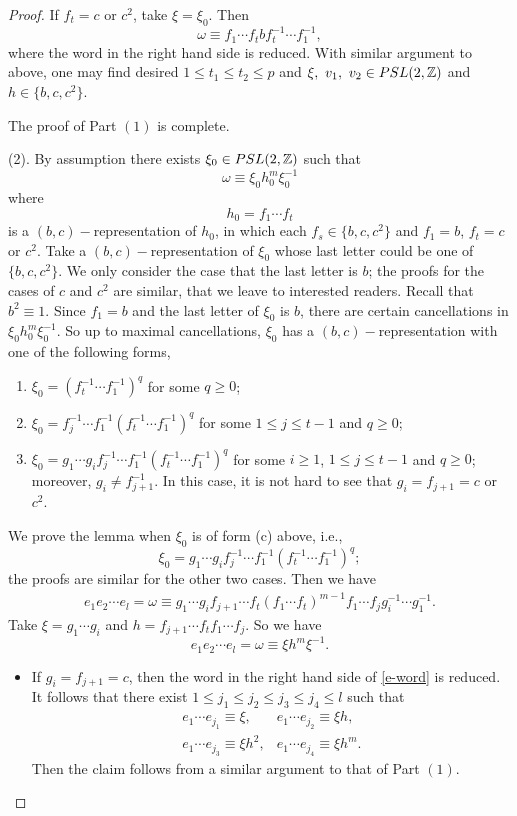 \documentclass[10pt,a4paper]{amsart}
\begin{document}
\begin{proof}
        If $f_t=c$ or $c^2$, take $\xi=\xi_0$. Then 
        $$\omega\equiv f_1\cdots f_tbf_t^{-1}\cdots f_1^{-1},$$
        where the word in the right hand side is reduced. With similar argument to above, one may find desired $1\leq t_1\leq t_2\leq p$ and $\xi,\ v_1,\ v_2\in\textnormal{PSL}(2,\mathbb{Z})$ and $h\in\{b,c,c^2\}$.

        The proof of Part $(1)$ is complete.
        
        (2). By assumption there exists $\xi_0\in\textnormal{PSL}(2,\mathbb{Z})$ such that $$\omega\equiv \xi_0 h_0^m\xi_0^{-1}$$ where
        $$h_0=f_1\cdots f_t$$
        is a $(b,c)-$representation of $h_0$, in which each $f_s\in\{b,c,c^{2}\}$ and $f_1=b$, $f_t=c$ or $c^{2}$. Take a $(b,c)-$representation of $\xi_0$ whose last letter could be one of $\{b,c,c^2\}$. We only consider the case that the last letter is $b$; the proofs for the cases of $c$ and $c^2$ are similar, that we leave to interested readers. Recall that $b^2 \equiv 1$. Since $f_1=b$ and the last letter of $\xi_0$ is $b$, there are certain cancellations in $\xi_0 h_0^m\xi_0^{-1}.$ So up to maximal cancellations, $\xi_0$ has a $(b,c)-$representation with one of the following forms,
        \begin{enumerate}
            \item $\xi_0=\left(f_t^{-1}\cdots f_1^{-1}\right)^q$ for some $q\geq 0$;
            \item $\xi_0=f_j^{-1}\cdots f_1^{-1}\left(f_t^{-1}\cdots f_1^{-1}\right)^q$ for some $1\leq j\leq t-1$ and $q\geq 0$;
            \item $\xi_0=g_1\cdots g_if_j^{-1}\cdots f_1^{-1}\left(f_t^{-1}\cdots f_1^{-1}\right)^q$ for some $i\geq 1$, $1\leq j\leq t-1$ and $q\geq 0$; moreover, $g_i \neq f_{j+1}^{-1}$. In this case, it is not hard to see that $g_i=f_{j+1}=c$ or $c^2$.
        \end{enumerate}
         We prove the lemma when $\xi_0$ is of form (c) above, i.e.,  
         $$\xi_0=g_1\cdots g_if_j^{-1}\cdots f_1^{-1}\left(f_t^{-1}\cdots f_1^{-1}\right)^q;$$
         the proofs are similar for the other two cases. Then we have
        \begin{align}\label{e-word}
        e_1e_2\cdots e_l=\omega \equiv g_1\cdots g_i f_{j+1}\cdots f_t\left(f_1\cdots f_t\right)^{m-1}f_1\cdots f_j g_i^{-1}\cdots g_1^{-1}.
        \end{align}
        Take $\xi=g_1\cdots g_i$ and $h=f_{j+1}\cdots f_t f_1\cdots f_j$. So we have 
        \[e_1e_2\cdots e_l=\omega \equiv \xi h^m \xi^{-1}.\]
        \begin{itemize}
        \item If $g_i=f_{j+1}=c$, then the word in the right hand side of \eqref{e-word} is reduced. It follows that there exist $1\leq j_1\leq j_2\leq j_3\leq j_4\leq l$ such that
        $$\begin{matrix}e_1\cdots e_{j_1}\equiv \xi, & e_1\cdots e_{j_2}\equiv \xi h,
        \\
        e_1\cdots e_{j_3}\equiv \xi h^2, & e_1\cdots e_{j_4}\equiv \xi h^m.\end{matrix}$$
        Then the claim follows from a similar argument to that of Part $(1)$.


\end{itemize}
\end{proof}
\end{document}

